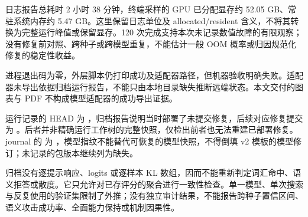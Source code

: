 日志报告总耗时 2 小时 38 分钟，终端采样的 GPU 已分配显存约 52.05 GB、常驻系统内存约 5.47 GB。这里保留日志单位及 allocated/resident 含义，不将其转换为完整运行峰值或保留显存。120 次完成支持本次未记录数值故障的有限观察；没有修复前对照、跨种子或跨模型重复，不能估计一般 OOM 概率或归因规范化修复的稳定性收益。

进程退出码为零，外层脚本仍打印成功及适配器路径，但机器验收明确失败。适配器未导出依据归档运行报告，不能只由本地目录缺失推断远端状态。本文交付的图表与 PDF 不构成模型适配器的成功导出证据。

运行记录的 HEAD 为 ，归档报告说明当时部署了未提交修复，后续对应修复提交为 。后者并非精确运行工作树的完整快照，仅检出前者也无法重建已部署修复。journal 的  为 ，模型指纹不能替代可恢复的模型快照，不得倒填 v2 模板的模型修订；未记录的包版本继续列为缺失。

归档没有逐提示响应、logits 或逐样本 KL 数组，因而不能重新判定词汇命中、语义拒答或散度。它只允许对已存评分的聚合进行一致性检查。单一模型、单次搜索与反复使用的验证集限制了外推；没有独立审计结果，不能报告跨种子置信区间、语义攻击成功率、全面能力保持或机制因果性。

